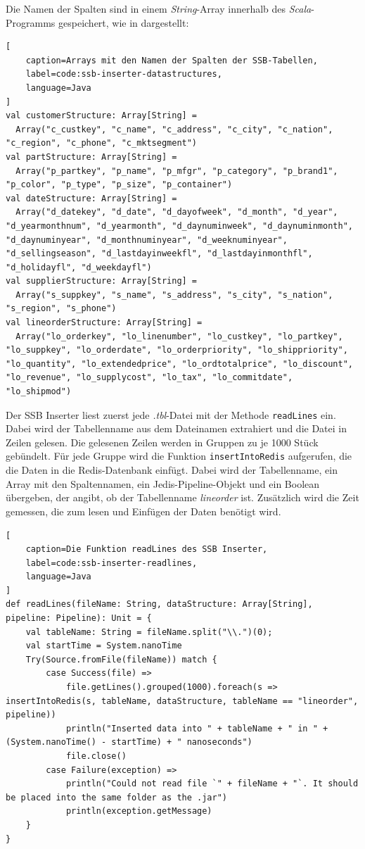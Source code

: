 Die Namen der Spalten sind in einem \emph{String}-Array innerhalb des \emph{Scala}-Programms gespeichert, wie in  dargestellt:

\begin{lstlisting}[
    caption=Arrays mit den Namen der Spalten der SSB-Tabellen,
    label=code:ssb-inserter-datastructures,
    language=Java
]
val customerStructure: Array[String] =
  Array("c_custkey", "c_name", "c_address", "c_city", "c_nation", "c_region", "c_phone", "c_mktsegment")
val partStructure: Array[String] =
  Array("p_partkey", "p_name", "p_mfgr", "p_category", "p_brand1", "p_color", "p_type", "p_size", "p_container")
val dateStructure: Array[String] =
  Array("d_datekey", "d_date", "d_dayofweek", "d_month", "d_year", "d_yearmonthnum", "d_yearmonth", "d_daynuminweek", "d_daynuminmonth", "d_daynuminyear", "d_monthnuminyear", "d_weeknuminyear", "d_sellingseason", "d_lastdayinweekfl", "d_lastdayinmonthfl", "d_holidayfl", "d_weekdayfl")
val supplierStructure: Array[String] =
  Array("s_suppkey", "s_name", "s_address", "s_city", "s_nation", "s_region", "s_phone")
val lineorderStructure: Array[String] =
  Array("lo_orderkey", "lo_linenumber", "lo_custkey", "lo_partkey", "lo_suppkey", "lo_orderdate", "lo_orderpriority", "lo_shippriority", "lo_quantity", "lo_extendedprice", "lo_ordtotalprice", "lo_discount", "lo_revenue", "lo_supplycost", "lo_tax", "lo_commitdate", "lo_shipmod")

\end{lstlisting}


Der SSB Inserter liest zuerst jede \emph{.tbl}-Datei mit der Methode \texttt{readLines} ein. Dabei wird der Tabellenname aus dem Dateinamen extrahiert und die Datei in Zeilen gelesen. Die gelesenen Zeilen werden in Gruppen zu je 1000 Stück gebündelt. Für jede Gruppe wird die Funktion \texttt{insertIntoRedis} aufgerufen, die die Daten in die Redis-Datenbank einfügt. Dabei wird der Tabellenname, ein Array mit den Spaltennamen, ein Jedis-Pipeline-Objekt und ein Boolean übergeben, der angibt, ob der Tabellenname \emph{lineorder} ist.
Zusätzlich wird die Zeit gemessen, die zum lesen und Einfügen der Daten benötigt wird.

\begin{lstlisting}[
    caption=Die Funktion readLines des SSB Inserter,
    label=code:ssb-inserter-readlines,
    language=Java
]
def readLines(fileName: String, dataStructure: Array[String], pipeline: Pipeline): Unit = {
	val tableName: String = fileName.split("\\.")(0);
	val startTime = System.nanoTime
	Try(Source.fromFile(fileName)) match {
		case Success(file) =>
			file.getLines().grouped(1000).foreach(s => insertIntoRedis(s, tableName, dataStructure, tableName == "lineorder", pipeline))
			println("Inserted data into " + tableName + " in " + (System.nanoTime() - startTime) + " nanoseconds")
			file.close()
		case Failure(exception) =>
			println("Could not read file `" + fileName + "`. It should be placed into the same folder as the .jar")
			println(exception.getMessage)
	}
}
\end{lstlisting}

